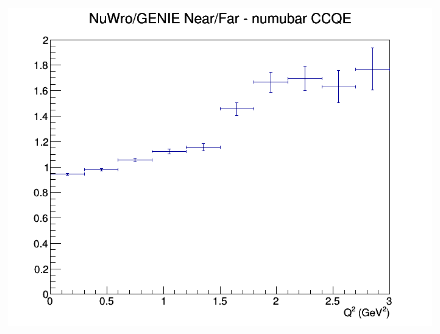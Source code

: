 \documentclass[12pt]{article}
\begin{document}
\begin{figure}[h]
\endminipage
{}
\includegraphics[width=\linewidth]{Q2/nominal/ratios/CCQE_NuWro_GENIE_numubar_NF_Q2.png}
\endminipage
\newline
\end{figure}
\clearpage
\end{document}
